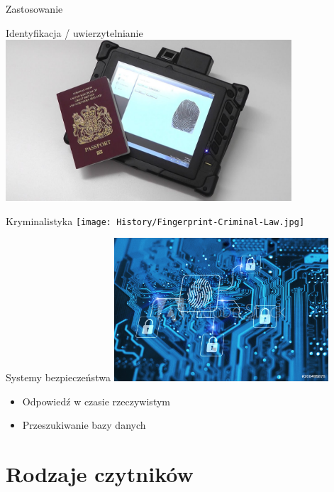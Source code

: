 \documentclass{beamer}
\begin{document}
\begin{frame}
    \centering
    \huge
    Zastosowanie
\end{frame}

\begin{frame}{Identyfikacja / uwierzytelnianie}
    \centering
    \includegraphics[width=0.8\textwidth]{History/passport_fingerprint.jpg}
\end{frame}

\begin{frame}{Kryminalistyka}
    \centering
    \texttt{[image: History/Fingerprint-Criminal-Law.jpg]}
\end{frame}

\begin{frame}{Systemy bezpieczeństwa}
    \centering
    \includegraphics[width=0.6\textwidth]{History/authorization.jpg}
    \begin{itemize}
        \centering
        \item{Odpowiedź w czasie rzeczywistym}
        \item{Przeszukiwanie bazy danych}
    \end{itemize}
\end{frame}

\section{Rodzaje czytników}
\end{document}
